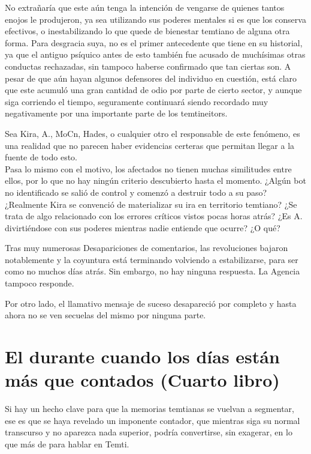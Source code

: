 \documentclass[
  spanish,
]{book}
\begin{document}
No extrañaría que este aún tenga la intención de vengarse de quienes tantos enojos le produjeron, ya sea utilizando sus poderes mentales si es que los conserva efectivos, o inestabilizando lo que quede de bienestar temtiano de alguna otra forma. Para desgracia suya, no es el primer antecedente que tiene en su historial, ya que el antiguo psíquico antes de esto también fue acusado de muchísimas otras conductas rechazadas, sin tampoco haberse confirmado que tan ciertas son. A pesar de que aún hayan algunos defensores del individuo en cuestión, está claro que este acumuló una gran cantidad de odio por parte de cierto sector, y aunque siga corriendo el tiempo, seguramente continuará siendo recordado muy negativamente por una importante parte de los temtineitors.

Sea Kira, A., MoCn, Hades, o cualquier otro el responsable de este fenómeno, es una realidad que no parecen haber evidencias certeras que permitan llegar a la fuente de todo esto.\\
Pasa lo mismo con el motivo, los afectados no tienen muchas similitudes entre ellos, por lo que no hay ningún criterio descubierto hasta el momento. ¿Algún bot no identificado se salió de control y comenzó a destruir todo a su paso? ¿Realmente Kira se convenció de materializar su ira en territorio temtiano? ¿Se trata de algo relacionado con los errores críticos vistos pocas horas atrás? ¿Es A. divirtiéndose con sus poderes mientras nadie entiende que ocurre? ¿O qué?

Tras muy numerosas Desapariciones de comentarios, las revoluciones bajaron notablemente y la coyuntura está terminando volviendo a estabilizarse, para ser como no muchos días atrás. Sin embargo, no hay ninguna respuesta. La Agencia tampoco responde.

Por otro lado, el llamativo mensaje de suceso desapareció por completo y hasta ahora no se ven secuelas del mismo por ninguna parte.

\hypertarget{el-durante-cuando-los-duxedas-estuxe1n-muxe1s-que-contados-cuarto-libro}{%
\chapter{El durante cuando los días están más que contados (Cuarto libro)}\label{el-durante-cuando-los-duxedas-estuxe1n-muxe1s-que-contados-cuarto-libro}}

Si hay un hecho clave para que la memorias temtianas se vuelvan a segmentar, ese es que se haya revelado un imponente contador, que mientras siga su normal transcurso y no aparezca nada superior, podría convertirse, sin exagerar, en lo que más de para hablar en Temti.
\end{document}
